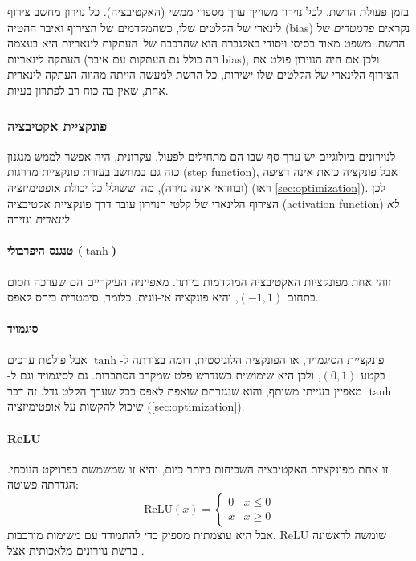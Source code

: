 \documentclass[hebrew, a4paper]{article}
\theoremstyle{plain}
\theoremstyle{definition}
\numberwithin{equation}{section}
\begin{document}
בזמן פעולת הרשת, לכל נוירון משוייך ערך מספרי ממשי (האקטיבציה). כל
נוירון מחשב צירוף לינארי של הקלטים שלו, כשהמקדמים של הצירוף ואיבר
ההטיה (bias) נקראים \emph{פרמטרים} של הרשת. משפט מאוד בסיסי ויסודי
באלגברה הוא שהרכבה של~העתקות לינאריות היא בעצמה העתקה לינאריות (וזה
כולל גם העתקות עם איבר bias), ולכן אם היה הנוירון פולט את הצירוף
הלינארי של הקלטים שלו ישירות, כל הרשת למעשה הייתה מהווה העתקה לינארית
אחת, שאין בה כוח רב לפתרון בעיות.

\subsubsection{פונקציית אקטיבציה}
\label{sec:activation}

לנוירונים ביולוגיים יש ערך סף שבו הם מתחילים לפעול. עקרונית, היה אפשר
לממש מנגנון כזה גם במחשב בעזרת פונקציית מדרגות (step function), אבל
פונקציה כזאת אינה רציפה (ובוודאי אינה גזירה), מה~ששולל כל יכולת
אופטימיזציה (ראו \autoref{sec:optimization}). לכן הצירוף הלינארי של
קלטי הנוירון עובר דרך פונקציית אקטיבציה (activation function) \emph{לא
  לינארית} וגזירה.

\paragraph{טנגנס היפרבולי ($\tanh$)}

זוהי אחת מפונקציות האקטיבציה המוקדמות ביותר. מאפייניה העיקריים הם
שערכה חסום בתחום $(-1,1)$, והיא פונקציה אי-זוגית, כלומר, סימטרית ביחס
לאפס.

\paragraph{סיגמויד}

פונקציית הסיגמויד, או הפונקציה הלוגיסטית, דומה בצורתה ל-$\tanh$ אבל
פולטת ערכים בקטע $(0,1)$, ולכן היא שימושית כשנדרש פלט שמקרב הסתברות.
גם לסיגמויד וגם ל-$\tanh$ מאפיין בעייתי משותף, והוא שנגזרתם שואפת לאפס
ככל שערך הקלט גדל. זה דבר שיכול להקשות על אופטימיזציה
(\autoref{sec:optimization}).

\paragraph{ReLU}

זו אחת מפונקציות האקטיבציה השכיחות ביותר כיום, והיא זו שמשמשת בפרויקט
הנוכחי. הגדרתה פשוטה:
\[
  \mathrm{ReLU}(x) =
  \begin{cases}
    0 & x \leq 0 \\
    x & x \geq 0
  \end{cases}
\]
אבל היא עוצמתית מספיק כדי להתמודד עם משימות מורכבות. ReLU שומשה
לראשונה ברשת נוירונים מלאכותית אצל .
\end{document}
